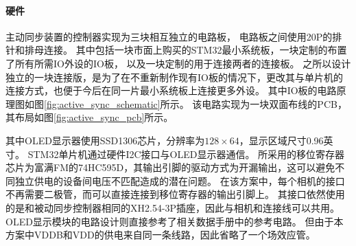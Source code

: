 \paragraph{硬件}
主动同步装置的控制器实现为三块相互独立的电路板，
电路板之间使用20P的排针和排母连接。
其中包括一块市面上购买的STM32最小系统板，一块定制的布置了所有所需IO外设的IO板，
以及一块定制的用于连接两者的连接板。
之所以设计独立的一块连接版，是为了在不重新制作现有IO板的情况下，更改其与单片机的连接方式，也便于今后在同一片最小系统板上连接更多外设。
其中IO板的电路原理图如图\ref{fig:active_sync_schematic}所示。
该电路实现为一块双面布线的PCB，其布局如图\ref{fig:active_sync_pcb}所示。

其中OLED显示器使用SSD1306芯片，分辨率为$128\times 64$，显示区域尺寸0.96英寸。
STM32单片机通过硬件I2C接口与OLED显示器通信。
所采用的移位寄存器芯片为富满FM的74HC595D，其输出引脚的驱动方式为开漏输出，这可以避免不同独立供电的设备间电压不匹配造成的潜在问题。
在该方案中，每个相机的接口不再需要二极管，而可以直接连接到移位寄存器的输出引脚上。
其接口依然使用的是和被动同步控制器相同的XH2.54-3P插座，因此与相机和连接线可以共用。
OLED显示模块的电路设计则直接参考了相关数据手册中的参考电路。
但由于本方案中VDDB和VDD的供电来自同一条线路，因此省略了一个场效应管。

\clearpage
